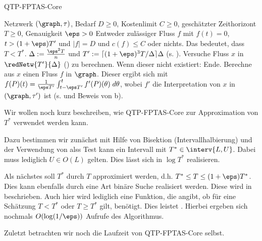 \begin{algorithm}[H]
\caption{QTP-FPTAS-Core}
\label{alg:qtp_core}
\begin{algorithmic}[1]
    \REQUIRE Netzwerk $(\graph, \tau)$, Bedarf $D \geq 0$, Kostenlimit $C \geq 0$,
        geschätzter Zeithorizont $T \geq 0$, Genauigkeit $\eps > 0$
    \ENSURE Entweder zulässiger Fluss $f$ mit $f(t) = 0$, $t > (1+\eps) T'$
        und $|f| = D$ und $c(f) \leq C$ oder nichts. Das bedeutet, dass
        $T < T^*$.
    \STATE $\Delta := \frac{\eps^2 T}{n}$ und
        $T' := \lceil (1+\eps)^3 T / \Delta \rceil \Delta$ (s. ).
    \STATE Versuche Fluss $x$ in $\redNetw{T'}{\Delta}$ ()
        zu berechnen. Wenn dieser nicht existiert: Ende.
    \STATE Berechne aus $x$ einen Fluss $f$ in $\graph$. Dieser ergibt sich mit
        $f(P)(t) = \frac{1}{\eps T'}
                            \int_{t - \eps T'}^{t} f'(P)(\theta) \; d\theta$,
        wobei $f'$ die Interpretation von $x$ in $(\graph, \tau')$ ist
        (s.  und Beweis von b).
\end{algorithmic}
\end{algorithm}

Wir wollen noch kurz beschreiben, wie QTP-FPTAS-Core zur Approximation von
$T^*$ verwendet werden kann.

Dazu bestimmen wir zunächst mit Hilfe von Bisektion (Intervallhalbierung)
und der Verwendung von  alss Test kann ein Intervall mit
$T^* \in \interv{L,U}$. Dabei muss lediglich $U \in O(L)$ gelten.
Dies lässt sich in $\log T^*$ realisieren.

Als nächstes soll $T^*$ durch $T$ approximiert werden,
d.h. $T^* \leq T \leq (1+\eps) T^*$. Dies kann ebenfalls durch eine Art binäre Suche
realisiert werden. Diese wird in \cite[Abschnitt 4]{Hassin} beschrieben. Auch hier
wird lediglich eine Funktion, die angibt, ob für eine Schätzung
$T < T^*$ oder $T \geq T^*$ gilt, benötigt. Dies leistet .
Hierbei ergeben sich nochmals $O(\log(1/\eps))$ Aufrufe des Algorithmus.

Zuletzt betrachten wir noch die Laufzeit von QTP-FPTAS-Core selbst.

